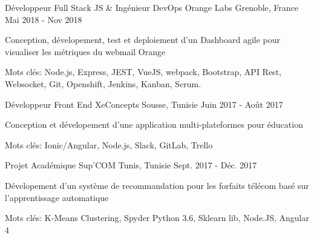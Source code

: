 

\begin{cventries}

  \cventry
    {Développeur Full Stack JS  \& Ingénieur DevOps} %
    {Orange Labs} %
    {Grenoble, France} %
    {Mai 2018 - Nov 2018} %
    {
      \begin{cvitems} %
        \item {Conception, dévelopement, test et deploiement  d'un Dashboard agile pour visualiser les métriques du webmail Orange}
        \item {Mots clés: Node.js, Express, JEST, VueJS, webpack, Bootstrap, API Rest, Websocket, Git, Openshift, Jenkins, Kanban, Scrum.}
      \end{cvitems}
    }

  \cventry
    {Développeur Front End} %
    {XeConcepts} %
    {Sousse, Tunisie} %
    {Juin 2017 - Août 2017} %
    {
      \begin{cvitems} %
        \item {Conception et dévelopement d'une application multi-plateformes pour éducation}
        \item {Mots clés: Ionic/Angular, Node.js, Slack, GitLab, Trello}
      \end{cvitems}
    }

  \cventry
    {Projet Académique} %
    {Sup'COM} %
    {Tunis, Tunisie} %
    {Sept. 2017 - Déc. 2017} %
    {
      \begin{cvitems} %
        \item {Dévelopement d'un système de recommandation pour les forfaits télécom basé sur l'apprentissage automatique }
        \item {Mots clés: K-Means Clustering, Spyder Python 3.6, Sklearn lib, Node.JS, Angular 4}
      \end{cvitems}
    }


\end{cventries}
